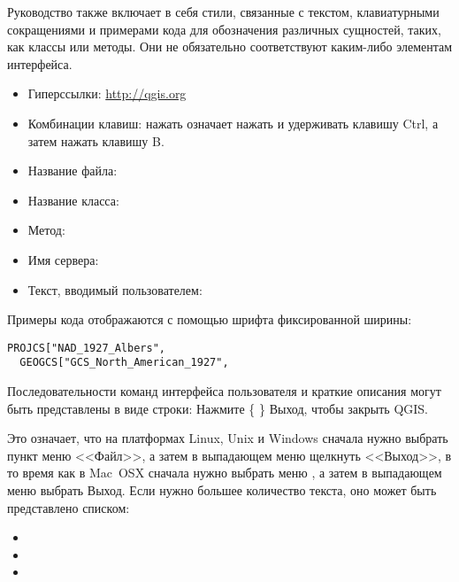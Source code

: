 
Руководство также включает в себя стили, связанные с текстом,
клавиатурными сокращениями и примерами кода для обозначения различных
сущностей, таких, как классы или методы. Они не обязательно соответствуют
каким-либо элементам интерфейса.

\begin{itemize}[label=--]
\item Гиперссылки: \url{http://qgis.org}
\item Комбинации клавиш: нажать  означает
нажать и удерживать клавишу Ctrl, а затем нажать клавишу B.
\item Название файла: 
\item Название класса: 
\item Метод: 
\item Имя сервера: 
\item Текст, вводимый пользователем: 
\end{itemize}

Примеры кода отображаются с помощью шрифта фиксированной ширины:
\begin{verbatim}
PROJCS["NAD_1927_Albers",
  GEOGCS["GCS_North_American_1927",
\end{verbatim}


Последовательности команд интерфейса пользователя и краткие описания
 могут быть представлены в виде строки: Нажмите \{\nix{}
\} \arrow Выход, чтобы закрыть QGIS.

Это означает, что на платформах Linux, Unix и Windows сначала нужно
выбрать пункт меню <<Файл>>, а затем в выпадающем меню щелкнуть <<Выход>>,
в то время как в Mac~OSX сначала нужно выбрать меню \qg,
а затем в выпадающем меню выбрать Выход. Если нужно большее количество
текста, оно может быть представлено списком:

\begin{itemize}
\item {}
\item {}
\item {}
\end{itemize}

